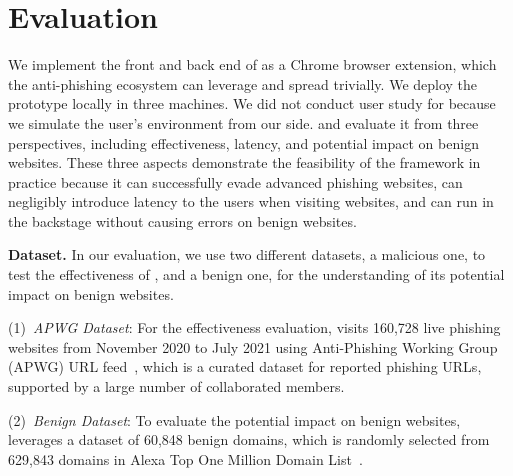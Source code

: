 


\section{Evaluation}
\label{s:eval}

We implement the front and back end of \spartacus as a Chrome browser extension, which the anti-phishing ecosystem can leverage and spread trivially.
We deploy the prototype locally in three machines.
We did not conduct user study for \spartacus because we simulate the user's environment from our side.
and evaluate it from three perspectives, including effectiveness, latency, and potential impact on benign websites.
These three aspects demonstrate the feasibility of the \spartacus framework in practice because it can successfully evade advanced phishing websites, can negligibly introduce latency to the users when visiting websites, and can run in the backstage without causing errors on benign websites.

\noindent
\textbf{Dataset.}
In our evaluation, we use two different datasets, a malicious one, to test the effectiveness of \spartacus, and a benign one, for the understanding of its potential impact on benign websites.

\noindent
(1)~\emph{APWG Dataset}:
For the effectiveness evaluation, \spartacus visits 160,728 live phishing websites from November 2020 to July 2021 using Anti-Phishing Working Group (APWG) URL feed~\cite{ecrimeexchange},
which is a curated dataset for reported phishing URLs, supported by a large number of collaborated members.

\noindent
(2)~\emph{Benign Dataset}:
To evaluate the potential impact on benign websites, \spartacus leverages a dataset of 60,848 benign domains, which is randomly selected from 629,843 domains in Alexa Top One Million Domain List~\cite{AlexaTop1M}.






